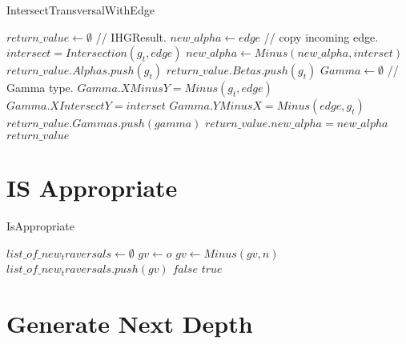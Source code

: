 \begin{algorithm}
	\caption{IntersectTransversalWithEdge}\label{IntersectTransversalWithEdge}
	\begin{algorithmic}[1]
		\State $return\_value \gets \emptyset$ // IHGResult.
		\State $new\_alpha \gets edge$ // copy incoming edge.
		\State $intersect = Intersection(g_t,edge)$
		\State $new\_alpha \gets Minus(new\_alpha,interset)$
		\State $return\_value.Alphas.push(g_t)$
		\Else
		\State $return\_value.Betas.push(g_t)$		
		\Else
		\State $Gamma \gets \emptyset$ // Gamma type.
		\State $Gamma.XMinusY = Minus(g_t,edge)$
		\State $Gamma.XIntersectY = interset$
		\State $Gamma.YMinusX = Minus(edge,g_t)$
		\State $return\_value.Gammas.push(gamma)$
		\EndIf
		\EndIf
		\EndFor
		\State $return\_value.new\_alpha = new\_alpha$
		\State \Return $return\_value$
		\EndFunction
	\end{algorithmic}
\end{algorithm}

\section{IS Appropriate}

\begin{algorithm}
	\caption{IsAppropriate}\label{IsAppropriate}
	\begin{algorithmic}[1]
		\State $list\_of\_new_traversals \gets \emptyset$
		\State $gv \gets o$
		\State $gv \gets Minus(gv,n)$
		\EndIf
		\EndFor
			\State $list\_of\_new_traversals.push(gv)$
			\EndIf
		\EndFor
		\State \Return $false$
		\EndIf
		\State \Return $true$
		\EndFunction
	\end{algorithmic}
\end{algorithm}


\section{Generate Next Depth}

